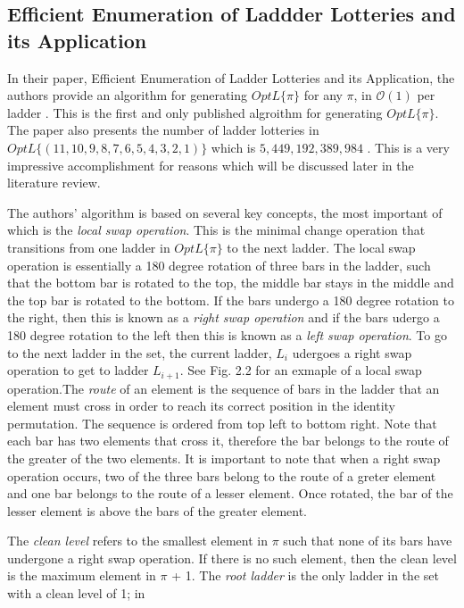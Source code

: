 \subsection{Efficient Enumeration of Laddder Lotteries and its Application}
In their paper, Efficient Enumeration of Ladder Lotteries and its Application,
the authors provide an algorithm for generating $OptL\{\pi\}$ 
for any $\pi$, in $\mathcal{O}(1)$ per ladder \cite{A1}. This is the first and only 
published algroithm for generating $OptL\{\pi\}$. The paper also presents the number 
of ladder lotteries in $OptL\{(11, 10, 9, 8, 7, 6, 5, 4, 3, 2, 1)\}$ which is 
$5,449,192,389,984$ \cite{A1}. This is a very impressive accomplishment for reasons which 
will be discussed later in the literature review.\par 
The authors' algorithm is based on several key concepts, the most 
important of which is the \emph{local swap operation}. This is the 
minimal change operation that transitions from one ladder in $OptL\{\pi\}$ to the 
next ladder. The local swap operation is essentially a 180 degree rotation
of three bars in the ladder, such that the bottom
bar is rotated to the top, the middle bar stays in the middle and the top bar
is rotated to the bottom. If the bars undergo a 180 degree rotation to the right, 
then this is known as a \emph{right swap operation} and 
if the bars udergo a 180 degree rotation to the left then this 
is known as a \emph{left swap operation}. To go to the next ladder in the set, 
the current ladder, $L_{i}$ udergoes a right swap operation 
to get to ladder $L_{i+1}$. See Fig. 2.2 for an exmaple of a 
local swap operation.The \emph{route} of an element is the sequence of bars in the ladder that an element must cross in order to reach its correct position in 
the identity permutation. The sequence is ordered from top left to bottom right.
Note that each bar has two elements that cross it, 
therefore the bar belongs to the route of the greater of the two elements. 
It is important to note that when a right swap operation occurs, 
two of the three bars belong to the route of a greter element and one bar belongs
to the route of a lesser element. Once rotated, the bar of the lesser element is 
above the bars of the greater element.\par
The \emph{clean level} refers to the smallest element 
in $\pi$ such that none of its bars have undergone a right swap operation.
If there is no such element, then the clean level is the maximum element in $\pi$ + 1.
The \emph{root ladder} is the only ladder in  the set with a clean level of 1; in 
